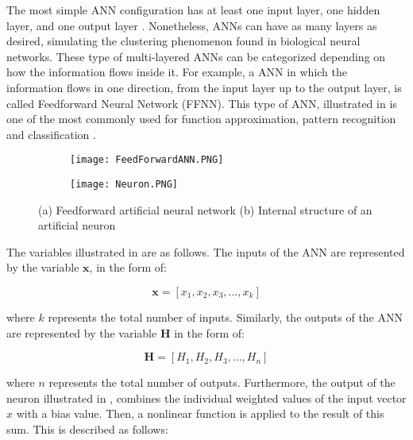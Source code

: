 The most simple ANN configuration has at least one input layer, one hidden layer, and one output layer . Nonetheless, ANNs can have as many layers as desired, simulating the clustering phenomenon found in biological neural networks. These type of multi-layered ANNs can be categorized depending on how the information flows inside it. For example, a ANN in which the information flows in one direction, from the input layer up to the output layer, is called Feedforward Neural Network (FFNN). This type of ANN, illustrated in  is one of the most commonly used for function approximation, pattern recognition and classification \cite{zhang2003artificial}.

\begin{figure}[htb!]
	\centering
    \begin{subfigure}[b]{0.49\textwidth}
        \centering
        \texttt{[image: FeedForwardANN.PNG]}
        \caption{}
        \label{fig:FFANN}
    \end{subfigure}
    \begin{subfigure}[b]{0.49\textwidth}
        \centering
        \texttt{[image: Neuron.PNG]}
        \caption{}
        \label{fig:neuron}
    \end{subfigure}
    \caption{(a) Feedforward artificial neural network (b) Internal structure of an artificial neuron\cite{rodriguez2019application}}
    \label{fig:neruonANN}
\end{figure}

The variables illustrated in  are as follows. The inputs of the ANN are represented by the variable $\mathbf{x}$, in the form of:

\begin{equation}
    \mathbf{x} = [x_1, x_2, x_3, ... , x_k ]
    \label{c6_neuronin}
\end{equation}

\noindent where $k$ represents the total number of inputs. Similarly, the outputs of the ANN are represented by the variable $\mathbf{H}$ in the form of:

\begin{equation}
    \mathbf{H} = [H_1, H_2, H_3, ... , H_n ]
    \label{c6_networkout}
\end{equation}

\noindent where $n$ represents the total number of outputs. Furthermore, the output of the neuron illustrated in , combines the individual weighted values of the input vector $x$ with a bias value. Then, a nonlinear function is applied to the result of this sum. This is described as follows:

